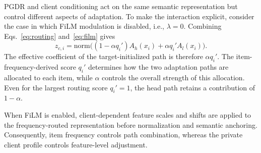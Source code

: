 PGDR and client conditioning act on the same semantic representation but control different aspects of adaptation. To make the interaction explicit, consider the case in which FiLM modulation is disabled, i.e., $\lambda=0$. Combining Eqs.~\eqref{eq:routing} and~\eqref{eq:film} gives
\begin{equation}
z_{c,i}=\mathrm{norm}\big((1-\alpha q_i')A_h(x_i)+\alpha q_i'A_l(x_i)\big).
\label{eq:effective-routing}
\end{equation}
The effective coefficient of the target-initialized path is therefore $\alpha q_i'$. The item-frequency-derived score $q_i'$ determines how the two adaptation paths are allocated to each item, while $\alpha$ controls the overall strength of this allocation. Even for the largest routing score $q_i'=1$, the head path retains a contribution of $1-\alpha$.

When FiLM is enabled, client-dependent feature scales and shifts are applied to the frequency-routed representation before normalization and semantic anchoring. Consequently, item frequency controls path combination, whereas the private client profile controls feature-level adjustment.


